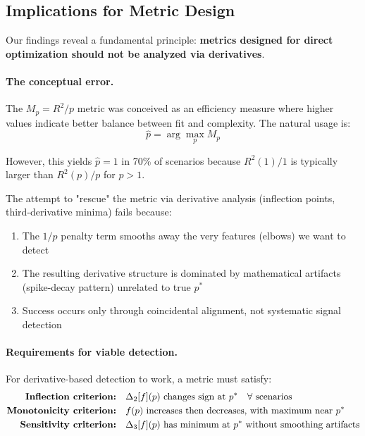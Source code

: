 \documentclass[11pt,a4paper]{article}
\begin{document}
\subsection{Implications for Metric Design}

Our findings reveal a fundamental principle: \textbf{metrics designed for direct optimization should not be analyzed via derivatives}.

\paragraph{The conceptual error.}
The $M_p = R^2/p$ metric was conceived as an efficiency measure where higher values indicate better balance between fit and complexity. The natural usage is:
\begin{equation}
\hat{p} = \arg\max_p M_p
\end{equation}

However, this yields $\hat{p} = 1$ in 70\% of scenarios because $R^2(1)/1$ is typically larger than $R^2(p)/p$ for $p > 1$.

The attempt to "rescue" the metric via derivative analysis (inflection points, third-derivative minima) fails because:
\begin{enumerate}
\item The $1/p$ penalty term smooths away the very features (elbows) we want to detect
\item The resulting derivative structure is dominated by mathematical artifacts (spike-decay pattern) unrelated to true $p^*$
\item Success occurs only through coincidental alignment, not systematic signal detection
\end{enumerate}

\paragraph{Requirements for viable detection.}
For derivative-based detection to work, a metric must satisfy:
\begin{align}
\text{\textbf{Inflection criterion:}} \quad &\Delta_2[f](p) \text{ changes sign at } p^* \quad \forall \text{ scenarios} \label{eq:inflection_req} \\
\text{\textbf{Monotonicity criterion:}} \quad &f(p) \text{ increases then decreases, with maximum near } p^* \label{eq:monotone_req} \\
\text{\textbf{Sensitivity criterion:}} \quad &\Delta_3[f](p) \text{ has minimum at } p^* \text{ without smoothing artifacts} \label{eq:sensitivity_req}
\end{align}
\end{document}
